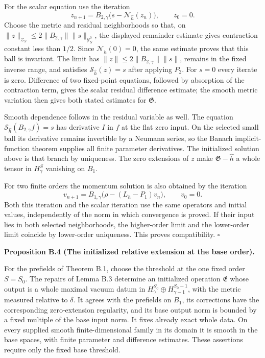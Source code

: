 \documentclass[
  english,
  11pt,
  reqno]{amsart}
\makeatletter
\newcommand{\pandocstatementheading}[1]{%
  \par\if@nobreak\else
    \addpenalty{\@beginparpenalty}%
    \addvspace{.5\baselineskip plus .2\baselineskip minus .2\baselineskip}%
  \fi
  {\normalfont\bfseries #1\par}%
  \nobreak\@afterindenttrue\@afterheading
}
\makeatother
\begin{document}
For the scalar equation use the iteration \[
z_{n+1}
=B_{2,\gamma}\bigl(s-\mathcal N_{\widehat h}(z_n)\bigr),
\qquad z_0=0.
\] Choose the metric and residual neighborhoods so that, on
\(\|z\|_{\mathcal Z_S}\le2\|B_{2,\gamma}\|\|s\|_{\mathcal Y_S^0}\), the
displayed remainder estimate gives contraction constant less than
\(1/2\). Since \(\mathcal N_{\widehat h}(0)=0\), the same estimate
proves that this ball is invariant. The limit has
\(\|z\|\le2\|B_{2,\gamma}\|\|s\|\), remains in the fixed inverse range,
and satisfies \(\mathcal S_{\widehat h}(z)=s\) after applying \(P_2\).
For \(s=0\) every iterate is zero. Difference of two fixed-point
equations, followed by absorption of the contraction term, gives the
scalar residual difference estimate; the smooth metric variation then
gives both stated estimates for \(\mathfrak G\).

Smooth dependence follows in the residual variable as well. The equation
\(\mathcal S_{\widehat h}(B_{2,\gamma}f)=s\) has derivative \(I\) in
\(f\) at the flat zero input. On the selected small ball its derivative
remains invertible by a Neumann series, so the Banach implicit-function
theorem supplies all finite parameter derivatives. The initialized
solution above is that branch by uniqueness. The zero extensions of
\(z\) make \(\mathfrak G-\widehat h\) a whole tensor in \(H^S_\gamma\)
vanishing on \(B_1\).

For two finite orders the momentum solution is also obtained by the
iteration \[
v_{n+1}
=B_{1,\gamma}\bigl(\rho-(L_h-P_1)v_n\bigr),\qquad v_0=0.
\] Both this iteration and the scalar iteration use the same operators
and initial values, independently of the norm in which convergence is
proved. If their input lies in both selected neighborhoods, the
higher-order limit and the lower-order limit coincide by lower-order
uniqueness. This proves compatibility. \hfill\(\square\)

\pandocstatementheading{\leavevmode{}\label{prop:online-extension-initialized-base-branch}Proposition B.4 (The initialized relative extension at the base order).}

For the prefields of Theorem B.1, choose the threshold at the one fixed
order \(S=S_0\). The repairs of Lemma B.3 determine an initialized
operation \(\mathfrak E\) whose output is a whole maximal vacuum datum
in \(H^{S_0}_\gamma\oplus H^{S_0-1}_{\gamma-1}\), with the metric
measured relative to \(\delta\). It agrees with the prefields on
\(B_1\), its corrections have the corresponding zero-extension
regularity, and its base output norm is bounded by a fixed multiple of
the base input norm. It fixes already exact whole data. On every
supplied smooth finite-dimensional family in its domain it is smooth in
the base spaces, with finite parameter and difference estimates. These
assertions require only the fixed base threshold.
\end{document}
